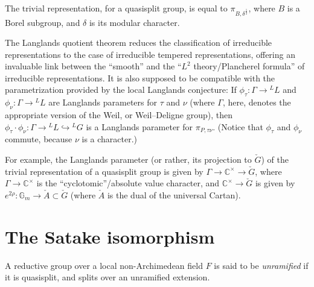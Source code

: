 \begin{example}
 \label{example-trivial-representation}
The trivial representation, for a quasisplit group, is equal to $\pi_{B, \delta^\frac{1}{2}}$, where $B$ is a Borel subgroup, and $\delta$ is its modular character.
\end{example}


\begin{remark}
 \label{remark-Langlands-classification}
The Langlands quotient theorem reduces the classification of irreducible representations to the case of irreducible tempered representations, offering an invaluable link between the ``smooth'' and the ``$L^2$ theory/Plancherel formula'' of irreducible representations. It is also supposed to be compatible with the parametrization provided by the local Langlands conjecture: If $\phi_\tau: \Gamma\to {^LL}$ and $\phi_\nu: \Gamma\to {^LL}$ are Langlands parameters for $\tau$ and $\nu$ (where $\Gamma$, here, denotes the appropriate version of the Weil, or Weil--Deligne group), then $\phi_\tau\cdot\phi_\nu: \Gamma\to {^LL}\hookrightarrow {^LG}$ is a Langlands parameter for $\pi_{P,\tau\nu}$. (Notice that $\phi_\tau$ and $\phi_\nu$ commute, because $\nu$ is a character.)

For example, the Langlands parameter (or rather, its projection to $\check G$) of the trivial representation of a quasisplit group is given by $\Gamma \to \mathbb C^\times \to \check G$, where $\Gamma \to \mathbb C^\times$ is the ``cyclotomic''/absolute value character, and $\mathbb C^\times \to \check G$ is given by $e^{2\rho}: \mathbb G_m\to \check A\subset\check G$ (where $\check A$ is the dual of the universal Cartan).
\end{remark}


\section{The Satake isomorphism}
\label{section-Satake-isomorphism}


\begin{definition}
 \label{definition-unramified-group}
A reductive group over a local non-Archimedean field $F$ is said to be {\it unramified} if it is quasisplit, and splits over an unramified extension.
\end{definition}


